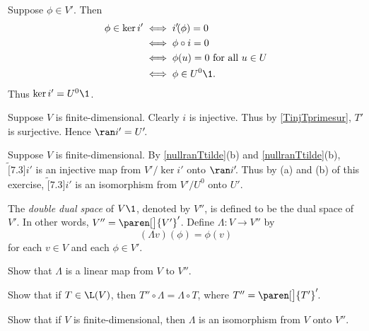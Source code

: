 \begin{Solution}
\begin{subtheorem}
\item
Suppose $\phi \in V'\!$. Then
\begin{align*}
\phi \in \ker i' &\iff i' \! (\phi) = 0 \\
&\iff \phi \circ i = 0 \\
&\iff \phi(u) = 0 \text{\ for all\ } u \in U \\
&\iff \phi \in U^0\1.
\end{align*}
Thus $\ker i' = U^0\1$.

\item
Suppose $V$ is finite-dimensional. Clearly $i$ is injective. Thus by \ref{TinjTprimesur}, $T'$ is surjective. Hence $\ran i' = U'\!$.

\item
Suppose $V$ is finite-dimensional. By \ref{nullranTtilde}(b) and \ref{nullranTtilde}(b), $\tilde[7.3]{i'}$ is an injective map from $V'/\ker i'$ onto $\ran i'\!$. Thus by (a) and (b) of this exercise, $\tilde[7.3]{i'}$ is an isomorphism from $V'/U^0$ onto $U'\!$.
\end{subtheorem}
\end{Solution}

\pagebreak[3]

\exercise
The \emph{double dual space} of $V\1$, denoted by $V''\!$, is defined to be the dual space of~$V'\!$. In other words,
$V'' = {\paren[\big]{V'}}'$\!. Define $\Lambda \colon V \to V''$ by
\[
(\Lambda v)(\phi) = \phi(v)
\]
for each $v \in V$ and each $\phi \in V'\!$.
\begin{subtheorem}
\item
Show that $\Lambda$ is a linear map from $V$ to $V''\!$.
\item
Show that if $T \in \L(V)$, then $T'' \circ \Lambda = \Lambda \circ T$, where $T'' = {\paren[\big]{T'}}'\!$.
\item
Show that if $V$ is finite-dimensional, then $\Lambda$ is an isomorphism from $V$ onto $V''\!$.
\end{subtheorem}

